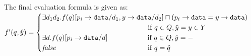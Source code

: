 \documentclass{llncs}
\newcommand{\data}{\texttt{data}}
\begin{document}
The final evaluation formula is given as: \\
$f'(q, \hat{y}) = \begin{cases}
        \exists d_1 d_2. f(q)[p_i\rightarrow\data/d_1, y\rightarrow\data/d_2] \sqcap (p_i\rightarrow\data = y\rightarrow\data)\\
        ~~~~~~~~~~~~~~~~~~~~~~~~~~~~~~~~~~~~~~~~~~~~~ \text{if $q \in Q, \hat{y} = y \in Y$}\\
        \exists d. f(q)[p_i\rightarrow\data/d]   ~~~~~~~~~~~~~~~~~ \text{if $q \in Q, \hat{y} = -$}\\
        \text{\emph{false}}    ~~~~~~~~~~~~~~~~~~~~~~~~~~~~~~~~~~~~~~~ \text{if $q = \hat{q}$}\\
      \end{cases}
$\\
\end{document}
